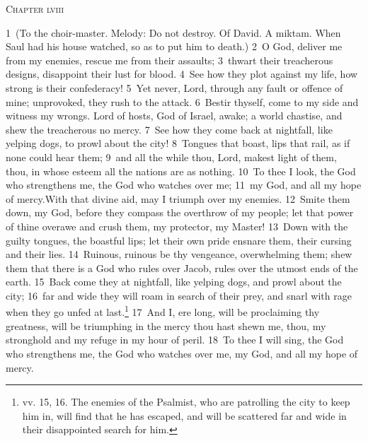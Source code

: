 \documentclass[10pt]{book} %
\begin{document}
\begin{large}\begin{center}\textsc{Chapter lviii}\end{center}\end{large}
\textcolor{benred8}{1}~(To the choir-master. Melody: Do not destroy. Of David. A miktam. When Saul had his house watched, so as to put him to death.)
\textcolor{benred8}{2}~O God, deliver me from my enemies, rescue me from their assaults; \textcolor{benred8}{3}~thwart their treacherous designs, disappoint their lust for blood. \textcolor{benred8}{4}~See how they plot against my life, how strong is their confederacy! \textcolor{benred8}{5}~Yet never, Lord, through any fault or offence of mine; unprovoked, they rush to the attack. \textcolor{benred8}{6}~Bestir thyself, come to my side and witness my wrongs. Lord of hosts, God of Israel, awake; a world chastise, and shew the treacherous no mercy. \textcolor{benred8}{7}~See how they come back at nightfall, like yelping dogs, to prowl about the city! \textcolor{benred8}{8}~Tongues that boast, lips that rail, as if none could hear them; \textcolor{benred8}{9}~and all the while thou, Lord, makest light of them, thou, in whose esteem all the nations are as nothing. \textcolor{benred8}{10}~To thee I look, the God who strengthens me, the God who watches over me; \textcolor{benred8}{11}~my God, and all my hope of mercy.With that divine aid, may I triumph over my enemies. \textcolor{benred8}{12}~Smite them down, my God, before they compass the overthrow of my people; let that power of thine overawe and crush them, my protector, my Master! \textcolor{benred8}{13}~Down with the guilty tongues, the boastful lips; let their own pride ensnare them, their cursing and their lies. \textcolor{benred8}{14}~Ruinous, ruinous be thy vengeance, overwhelming them; shew them that there is a God who rules over Jacob, rules over the utmost ends of the earth. \textcolor{benred8}{15}~Back come they at nightfall, like yelping dogs, and prowl about the city; \textcolor{benred8}{16}~far and wide they will roam in search of their prey, and snarl with rage when they go unfed at last.\footnote[1]{vv. 15, 16. The enemies of the Psalmist, who are patrolling the city to keep him in, will find that he has escaped, and will be scattered far and wide in their disappointed search for him.} \textcolor{benred8}{17}~And I, ere long, will be proclaiming thy greatness, will be triumphing in the mercy thou hast shewn me, thou, my stronghold and my refuge in my hour of peril. \textcolor{benred8}{18}~To thee I will sing, the God who strengthens me, the God who watches over me, my God, and all my hope of mercy.
\end{document}
